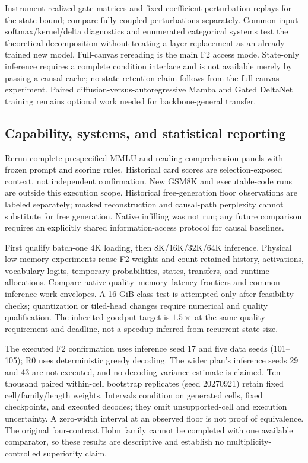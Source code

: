 Instrument realized gate matrices and fixed-coefficient perturbation replays for the state bound; compare fully coupled perturbations separately. Common-input softmax/kernel/delta diagnostics and enumerated categorical systems test the theoretical decomposition without treating a layer replacement as an already trained new model. Full-canvas rereading is the main F2 access mode. State-only inference requires a complete condition interface and is not available merely by passing a causal cache; no state-retention claim follows from the full-canvas experiment. Paired diffusion-versus-autoregressive Mamba and Gated DeltaNet training remains optional work needed for backbone-general transfer.

\subsection{Capability, systems, and statistical reporting}
\label{m:quality}
Rerun complete prespecified MMLU and reading-comprehension panels with frozen prompt and scoring rules. Historical card scores are selection-exposed context, not independent confirmation. New GSM8K and executable-code runs are outside this execution scope. Historical free-generation floor observations are labeled separately; masked reconstruction and causal-path perplexity cannot substitute for free generation. Native infilling was not run; any future comparison requires an explicitly shared information-access protocol for causal baselines.

First qualify batch-one 4K loading, then 8K/16K/32K/64K inference. Physical low-memory experiments reuse F2 weights and count retained history, activations, vocabulary logits, temporary probabilities, states, transfers, and runtime allocations. Compare native quality--memory--latency frontiers and common inference-work envelopes. A 16-GiB-class test is attempted only after feasibility checks; quantization or tiled-head changes require numerical and quality qualification. The inherited goodput target is $1.5\times$ at the same quality requirement and deadline, not a speedup inferred from recurrent-state size.

The executed F2 confirmation uses inference seed 17 and five data seeds (101--105); R0 uses deterministic greedy decoding. The wider plan's inference seeds 29 and 43 are not executed, and no decoding-variance estimate is claimed. Ten thousand paired within-cell bootstrap replicates (seed 20270921) retain fixed cell/family/length weights. Intervals condition on generated cells, fixed checkpoints, and executed decodes; they omit unsupported-cell and execution uncertainty. A zero-width interval at an observed floor is not proof of equivalence. The original four-contrast Holm family cannot be completed with one available comparator, so these results are descriptive and establish no multiplicity-controlled superiority claim.

